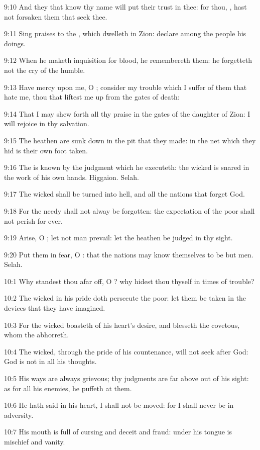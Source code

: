 9:10 And they that know thy name will put their trust in thee: for
thou, \LORD, hast not forsaken them that seek thee.

9:11 Sing praises to the \LORD, which dwelleth in Zion: declare among
the people his doings.

9:12 When he maketh inquisition for blood, he remembereth them: he
forgetteth not the cry of the humble.

9:13 Have mercy upon me, O \LORD; consider my trouble which I suffer of
them that hate me, thou that liftest me up from the gates of death:

9:14 That I may shew forth all thy praise in the gates of the daughter
of Zion: I will rejoice in thy salvation.

9:15 The heathen are sunk down in the pit that they made: in the net
which they hid is their own foot taken.

9:16 The \LORD is known by the judgment which he executeth: the wicked
is snared in the work of his own hands. Higgaion. Selah.

9:17 The wicked shall be turned into hell, and all the nations that
forget God.

9:18 For the needy shall not alway be forgotten: the expectation of
the poor shall not perish for ever.

9:19 Arise, O \LORD; let not man prevail: let the heathen be judged in
thy sight.

9:20 Put them in fear, O \LORD: that the nations may know themselves to
be but men. Selah.



10:1 Why standest thou afar off, O \LORD? why hidest thou thyself in
times of trouble?

10:2 The wicked in his pride doth persecute the poor: let them be
taken in the devices that they have imagined.

10:3 For the wicked boasteth of his heart's desire, and blesseth the
covetous, whom the \LORD abhorreth.

10:4 The wicked, through the pride of his countenance, will not seek
after God: God is not in all his thoughts.

10:5 His ways are always grievous; thy judgments are far above out of
his sight: as for all his enemies, he puffeth at them.

10:6 He hath said in his heart, I shall not be moved: for I shall
never be in adversity.

10:7 His mouth is full of cursing and deceit and fraud: under his
tongue is mischief and vanity.


